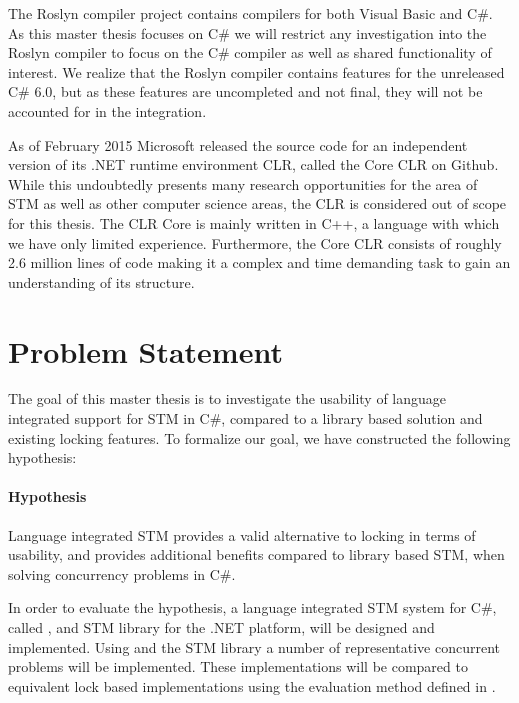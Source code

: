 
The Roslyn compiler project contains compilers for both Visual Basic and C\#\cite{roslyn}. As this master thesis focuses on C\# we will restrict any investigation into the Roslyn compiler to focus on the C\# compiler as well as shared functionality of interest. We realize that the Roslyn compiler contains features for the unreleased C\# 6.0, but as these features are uncompleted and not final, they will not be accounted for in the integration.

As of February 2015 Microsoft released the source code for an independent version of its .NET runtime environment \acl{CLR}, called the Core \ac{CLR} on Github\cite{coreclr}. While this undoubtedly presents many research opportunities for the area of \ac{STM} as well as other computer science areas, the \ac{CLR} is considered out of scope for this thesis. The \ac{CLR} Core is mainly written in C++\cite{coreclr}, a language with which we have only limited experience. Furthermore, the Core \ac{CLR} consists of roughly 2.6 million lines of code\cite{coreclrBlog} making it a complex and time demanding task to gain an understanding of its structure.

\section{Problem Statement}\label{sec:problem_statement}
The goal of this master thesis is to investigate the usability of language integrated support for \ac{STM} in C\#, compared to a library based solution and existing locking features. To formalize our goal, we have constructed the following hypothesis:

\paragraph{Hypothesis} Language integrated \ac{STM} provides a valid alternative to locking in terms of usability, and provides additional benefits compared to library based \ac{STM}, when solving concurrency problems in C\#.

In order to evaluate the hypothesis, a language integrated \ac{STM} system for C\#, called \stmname, and \ac{STM} library for the .NET platform, will be designed and implemented. Using \stmname and the \ac{STM} library a number of representative concurrent problems will be implemented. These implementations will be compared to equivalent lock based implementations using the evaluation method defined in .

